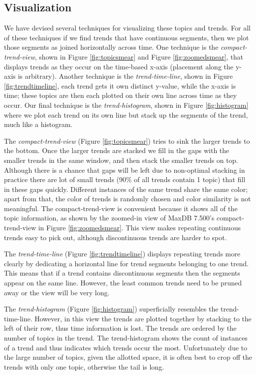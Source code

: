 \documentclass[times, 10pt,twocolumn]{article}
\newcommand{\shrinkit}{\vspace*{-.3em}}
\begin{document}
\shrinkit
\subsection{Visualization}
\shrinkit

We have devised several techniques for visualizing these topics and
trends.  For all of these techniques if we find trends that have
continuous segments, then we plot those segments as joined
horizontally across time. One technique is the \emph{compact-trend-view},
shown in Figure \ref{fig:topicsmear} and Figure \ref{fig:zoomedsmear},
that displays trends as they occur on the time-based x-axis
(placement along the y-axis is arbitrary).  Another technique is
the \emph{trend-time-line}, shown in Figure \ref{fig:trendtimeline},
each trend gets it own distinct y-value, while the x-axis is time;
these topics are then each plotted on their own line across time as
they occur. Our final technique is the \emph{trend-histogram}, shown in Figure
\ref{fig:histogram} where we plot each trend on its own line but stack
up the segments of the trend, much like a histogram.


The \emph{compact-trend-view} (Figure \ref{fig:topicsmear}) tries to
sink the larger trends to the bottom.  Once the larger trends are
stacked we fill in the gaps with the smaller trends in the same
window, and then stack the smaller trends on top.  Although there is a
chance that gaps will be left due to non-optimal stacking in practice
there are lot of small trends (90\% of all trends contain 1 topic)
that fill in these gaps quickly.  Different instances of the same
trend share the same color; apart from that, the color of trends is
randomly chosen and color similarity is not meaningful.  The
compact-trend-view is convenient because it shows all of the topic
information, as shown by the zoomed-in view of MaxDB 7.500's
compact-trend-view in Figure \ref{fig:zoomedsmear}. This view makes
repeating continuous trends easy to pick out, although discontinuous
trends are harder to spot.

The \emph{trend-time-line} (Figure
\ref{fig:trendtimeline}) displays repeating trends more clearly by
dedicating a horizontal line for trend segments belonging to one
trend. This means that if a trend contains discontinuous segments then
the segments appear on the same line.  However, the least common
trends need to be pruned away or the view will be very long.

The \emph{trend-histogram} (Figure \ref{fig:histogram}) superficially
resembles the trend-time-line.  However, in this view the trends are
plotted together by stacking to the left of their row, thus time
information is lost.  The trends are ordered by the number of topics
in the trend.  The trend-histogram shows the count of instances of a
trend and thus indicates which trends occur the most. Unfortunately
due to the large number of topics, given the allotted space, it is often
best to crop off the trends with only one topic, otherwise the tail is
long.
\end{document}
